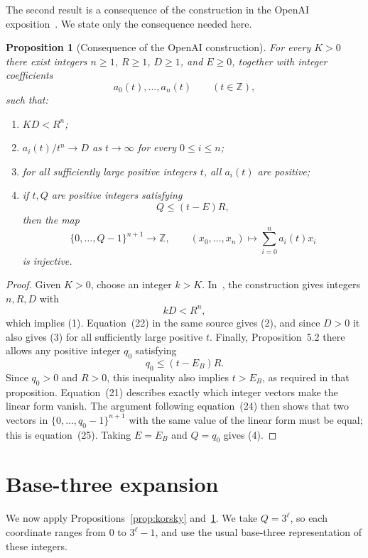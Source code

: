 \documentclass[10pt,a4paper]{amsart}
\newtheorem{proposition}[theorem]{Proposition}
\theoremstyle{remark}
\newcommand{\Z}{\mathbb Z}
\begin{document}
The second result is a consequence of the construction in the OpenAI exposition~\cite[Sections~2--6]{OpenAI2026}. We state only the consequence needed here.

\begin{proposition}[Consequence of the OpenAI construction]\label{prop:openai}
For every $K>0$ there exist integers $n\ge1$, $R\ge1$, $D\ge1$, and $E\ge0$, together with integer coefficients
\[
 a_0(t),\ldots,a_n(t)\qquad(t\in\Z),
\]
such that:
\begin{enumerate}
\item $KD<R^n$;
\item $a_i(t)/t^n\to D$ as $t\to\infty$ for every $0\le i\le n$;
\item for all sufficiently large positive integers $t$, all $a_i(t)$ are positive;
\item if $t,Q$ are positive integers satisfying
\[
 Q\le (t-E)R,
\]
then the map
\[
 \{0,\ldots,Q-1\}^{n+1}\longrightarrow\Z,
 \qquad
 (x_0,\ldots,x_n)\longmapsto\sum_{i=0}^n a_i(t)x_i
\]
is injective.
\end{enumerate}
\end{proposition}

\begin{proof}
Given $K>0$, choose an integer $k>K$. In~\cite[equation~(16)]{OpenAI2026}, the construction gives integers $n,R,D$ with
\[
 kD<R^n,
\]
which implies (1). Equation~(22) in the same source gives (2), and since $D>0$ it also gives (3) for all sufficiently large positive $t$. Finally, Proposition~5.2 there allows any positive integer $q_0$ satisfying
\[
 q_0\le (t-E_B)R.
\]
Since $q_0>0$ and $R>0$, this inequality also implies $t>E_B$, as required in that proposition. Equation~(21) describes exactly which integer vectors make the linear form vanish. The argument following equation~(24) then shows that two vectors in $\{0,\ldots,q_0-1\}^{n+1}$ with the same value of the linear form must be equal; this is equation~(25). Taking $E=E_B$ and $Q=q_0$ gives (4).
\end{proof}

\section{Base-three expansion}

We now apply Propositions~\ref{prop:korsky} and~\ref{prop:openai}. We take $Q=3^\ell$, so each coordinate ranges from $0$ to $3^\ell-1$, and use the usual base-three representation of these integers.
\end{document}
